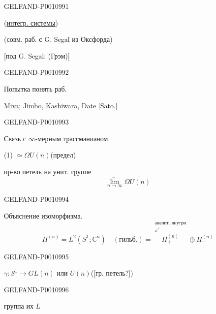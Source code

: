 \begin{GelfandAdjacentEvidence}{GELFAND-P001099}{1}
\begin{center}
\qquad(\underline{интегр. системы})
\end{center}
(совм. раб. с G. Segal из Оксфорда)

[под G. Segal: (Грэм)]

\end{GelfandAdjacentEvidence}
\begin{GelfandAdjacentEvidence}{GELFAND-P001099}{2}


Попытка понять раб.

Miva; Jimbo, Kashiwara, Date [Sato.]
\end{GelfandAdjacentEvidence}
\begin{GelfandAdjacentEvidence}{GELFAND-P001099}{3}


Связь с $\infty$-мерным грассманианом.

\begin{center}
(1)\quad{} $\simeq\Omega U(n)$\qquad(предел)
\end{center}
пр-во петель на унит. группе
\[
\underset{n\to\infty}{\underrightarrow{\lim}}\Omega U(n)
\]
\end{GelfandAdjacentEvidence}
\begin{GelfandAdjacentEvidence}{GELFAND-P001099}{4}


Объяснение изоморфизма.
\[
H^{(n)}=L^2(S^1;\mathbb C^n)\quad
(\text{гильб.})=
\overset{\substack{\text{аналит. внутри}\\\swarrow}}{H_+^{(n)}}\oplus H_-^{(n)}
\]
\end{GelfandAdjacentEvidence}
\begin{GelfandAdjacentEvidence}{GELFAND-P001099}{5}


$\gamma:S^1\to GL(n)$ или $U(n)$\qquad([гр. петель?])
\end{GelfandAdjacentEvidence}
\begin{GelfandAdjacentEvidence}{GELFAND-P001099}{6}


группа их $L$ \quad
{}
\end{GelfandAdjacentEvidence}
